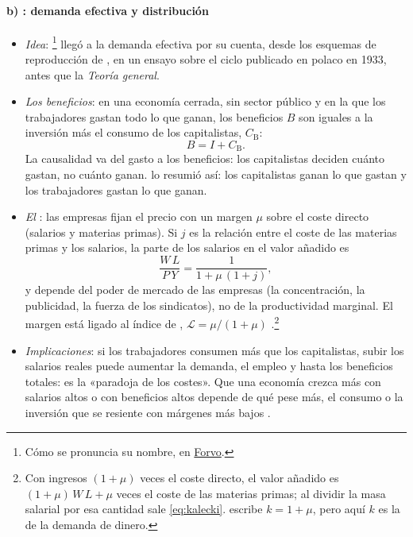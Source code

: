 \documentclass[11pt]{article}
\begin{document}
\paragraph{b) : demanda efectiva y distribución}

\begin{itemize}
\item \emph{Idea}: \footnote{Cómo se pronuncia su nombre, en \href{https://forvo.com/search/MICHA\%C5\%81\%20KALECKI/}{Forvo}.} llegó a la demanda efectiva por su cuenta, desde los esquemas de reproducción de , en un ensayo sobre el ciclo publicado en polaco en 1933, antes que la \emph{Teoría general}\nocite{Kalecki1933Proba,Kalecki1971Selected}.
\item \emph{Los beneficios}: en una economía cerrada, sin sector público y en la que los trabajadores gastan todo lo que ganan, los beneficios $B$ son iguales a la inversión más el consumo de los capitalistas, $C_{\mathrm{B}}$:
  \begin{equation}
  B=I+C_{\mathrm{B}}. \label{eq:beneficios-kalecki}
  \end{equation}
  La causalidad va del gasto a los beneficios: los capitalistas deciden cuánto gastan, no cuánto ganan. \textcite{Kaldor1956Alternative} lo resumió así: los capitalistas ganan lo que gastan y los trabajadores gastan lo que ganan.
\item \emph{El }: las empresas fijan el precio con un margen $\mu$ sobre el coste directo (salarios y materias primas). Si $j$ es la relación entre el coste de las materias primas y los salarios, la parte de los salarios en el valor añadido es
  \begin{equation}
  \frac{W\,L}{P\,Y}=\frac{1}{1+\mu\,(1+j)}, \label{eq:kalecki}
  \end{equation}
  y depende del poder de mercado de las empresas (la concentración, la publicidad, la fuerza de los sindicatos), no de la productividad marginal\nocite{Kalecki1938Determinants,Kalecki1954Theory}. El margen está ligado al índice de , $\mathcal{L}=\mu/(1+\mu)$ .\footnote{Con ingresos $(1+\mu)$ veces el coste directo, el valor añadido es $(1+\mu)\,W\,L+\mu$ veces el coste de las materias primas; al dividir la masa salarial por esa cantidad sale \eqref{eq:kalecki}.  escribe $k=1+\mu$, pero aquí $k$ es la de la demanda de dinero.}
\item \emph{Implicaciones}: si los trabajadores consumen más que los capitalistas, subir los salarios reales puede aumentar la demanda, el empleo y hasta los beneficios totales: es la «paradoja de los costes». Que una economía crezca más con salarios altos o con beneficios altos depende de qué pese más, el consumo o la inversión que se resiente con márgenes más bajos\nocite{BhaduriMarglin1990Unemployment} .

\end{itemize}
\end{document}
